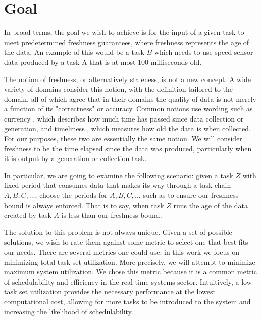 \section{Goal}

In broad terms, the goal we wish to achieve is for the input of a given task to meet predetermined freshness guarantees, where freshness represents the age of the data. An example of this would be a task $B$ which needs to use speed sensor data produced by a task A that is at most 100 milliseconds old.

The notion of freshness, or alternatively staleness, is not a new concept. A wide variety of domains consider this notion, with the definition tailored to the domain, all of which agree that in their domains the quality of data is not merely a function of its "correctness" or accuracy. Common notions use wording such as currency \cite{Segev1990}, which describes how much time has passed since data collection or generation, and timeliness \cite{Wang:1996:BAD:1189570.1189572}, which measures how old the data is when collected. For our purposes, these two are essentially the same notion. We will consider freshness to be the time elapsed since the data was produced, particularly when it is output by a generation or collection task.

In particular, we are going to examine the following scenario: given a task $Z$ with fixed period that consumes data that makes its way through a task chain $A, B, C, \ldots$, choose the periods for $A, B, C, \ldots$ such as to ensure our freshness bound is always enforced. That is to say, when task $Z$ runs the age of the data created by task $A$ is less than our freshness bound.

The solution to this problem is not always unique. Given a set of possible solutions, we wish to rate them against some metric to select one that best fits our needs. There are several metrics one could use; in this work we focus on minimizing total task set utilization. More precisely, we will attempt to minimize maximum system utilization. We chose this metric because it is a common metric of schedulability and efficiency in the real-time systems sector. Intuitively, a low task set utilization provides the necessary performance at the lowest computational cost, allowing for more tasks to be introduced to the system and increasing the likelihood of schedulability.